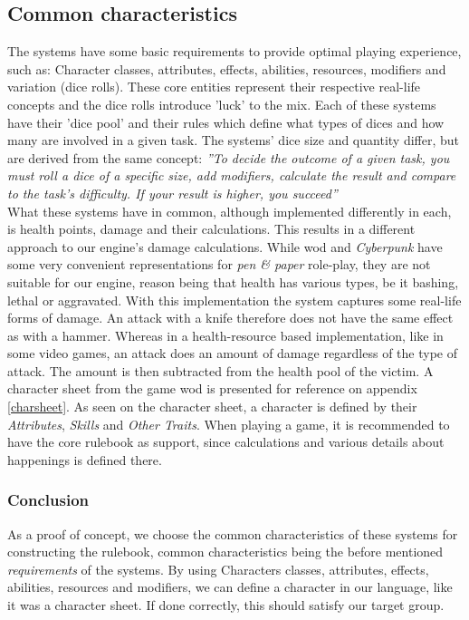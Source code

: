 \subsection*{Common characteristics}
\label{baseclasses}
The systems have some basic requirements to provide optimal playing experience, such as:
Character classes, attributes, effects, abilities, resources, modifiers and variation (dice rolls). These core entities represent their respective real-life concepts and the dice rolls introduce 'luck' to the mix.
Each of these systems have their 'dice pool' and their rules which define what types of dices and how many are involved in a given task.
The systems' dice size and quantity differ, but are derived from the same concept: \textit{''To decide the outcome of a given task, you must roll a dice of a specific size, add modifiers, calculate the result and compare to the task's difficulty. If your result is higher, you succeed''}\\

What these systems have in common, although implemented differently in each, is health points, damage and their calculations. This results in a different approach to our engine's damage calculations. While \ac{wod} and \emph{Cyberpunk} have some very convenient representations for \emph{pen \& paper} role-play, they are not suitable for our engine, reason being that health has various types, be it bashing, lethal or aggravated.
With this implementation the system captures some real-life forms of damage. An attack with a knife therefore does not have the same effect as with a hammer. Whereas in a health-resource based implementation, like in some video games, an attack does an amount of damage regardless of the type of attack. The amount is then subtracted from the health pool of the victim.
A character sheet from the game \ac{wod} is presented for reference on appendix \vref{charsheet}. As seen on the character sheet, a character is defined by their \emph{Attributes}, \emph{Skills} and \emph{Other Traits}. When playing a game, it is recommended to have the core rulebook as support, since calculations and various details about happenings is defined there.

\subsubsection*{Conclusion}
As a proof of concept, we choose the common characteristics of these systems for constructing the rulebook, common characteristics being the before mentioned \emph{requirements} of the systems.
By using Characters classes, attributes, effects, abilities, resources and modifiers, we can define a character in our language, like it was a character sheet. If done correctly, this should satisfy our target group.

